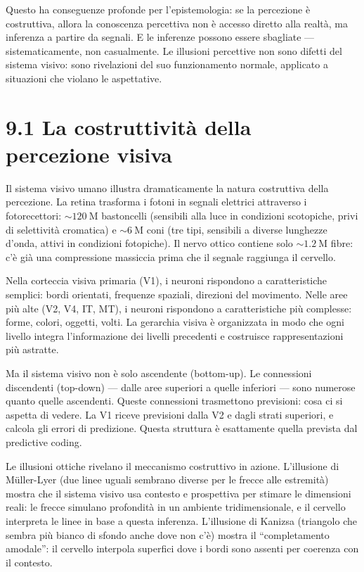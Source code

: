 \documentclass[11.5pt,a4paper,openany]{book}
\theoremstyle{remark}
\begin{document}
Questo ha conseguenze profonde per l'epistemologia: se la percezione è costruttiva, allora la conoscenza percettiva non è accesso diretto alla realtà, ma inferenza a partire da segnali. E le inferenze possono essere sbagliate --- sistematicamente, non casualmente. Le illusioni percettive non sono difetti del sistema visivo: sono rivelazioni del suo funzionamento normale, applicato a situazioni che violano le aspettative.

\section{9.1 La costruttività della percezione visiva}

Il sistema visivo umano illustra dramaticamente la natura costruttiva della percezione. La retina trasforma i fotoni in segnali elettrici attraverso i fotorecettori: $\sim 120\ \text{M}$ bastoncelli (sensibili alla luce in condizioni scotopiche, privi di selettività cromatica) e $\sim 6\ \text{M}$ coni (tre tipi, sensibili a diverse lunghezze d'onda, attivi in condizioni fotopiche). Il nervo ottico contiene solo $\sim 1.2\ \text{M}$ fibre: c'è già una compressione massiccia prima che il segnale raggiunga il cervello.

Nella corteccia visiva primaria (V1), i neuroni rispondono a caratteristiche semplici: bordi orientati, frequenze spaziali, direzioni del movimento. Nelle aree più alte (V2, V4, IT, MT), i neuroni rispondono a caratteristiche più complesse: forme, colori, oggetti, volti. La gerarchia visiva è organizzata in modo che ogni livello integra l'informazione dei livelli precedenti e costruisce rappresentazioni più astratte.

Ma il sistema visivo non è solo ascendente (bottom-up). Le connessioni discendenti (top-down) --- dalle aree superiori a quelle inferiori --- sono numerose quanto quelle ascendenti. Queste connessioni trasmettono previsioni: cosa ci si aspetta di vedere. La V1 riceve previsioni dalla V2 e dagli strati superiori, e calcola gli errori di predizione. Questa struttura è esattamente quella prevista dal predictive coding.

Le illusioni ottiche rivelano il meccanismo costruttivo in azione. L'illusione di Müller-Lyer (due linee uguali sembrano diverse per le frecce alle estremità) mostra che il sistema visivo usa contesto e prospettiva per stimare le dimensioni reali: le frecce simulano profondità in un ambiente tridimensionale, e il cervello interpreta le linee in base a questa inferenza. L'illusione di Kanizsa (triangolo che sembra più bianco di sfondo anche dove non c'è) mostra il ``completamento amodale'': il cervello interpola superfici dove i bordi sono assenti per coerenza con il contesto.
\end{document}
